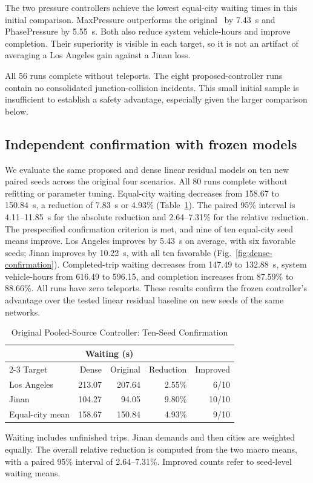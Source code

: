 The two pressure controllers achieve the lowest equal-city waiting times in this initial comparison. MaxPressure outperforms the original \method\ by 7.43~s and PhasePressure by 5.55~s. Both also reduce system vehicle-hours and improve completion. Their superiority is visible in each target, so it is not an artifact of averaging a Los Angeles gain against a Jinan loss.

All 56 runs complete without teleports. The eight proposed-controller runs contain no consolidated junction-collision incidents. This small initial sample is insufficient to establish a safety advantage, especially given the larger comparison below.

\subsection{Independent confirmation with frozen models}
We evaluate the same proposed and dense linear residual models on ten new paired seeds across the original four scenarios. All 80 runs complete without refitting or parameter tuning. Equal-city waiting decreases from 158.67 to 150.84~s, a reduction of 7.83~s or 4.93\% (Table~\ref{tab:dense-confirmation}). The paired 95\% interval is 4.11--11.85~s for the absolute reduction and 2.64--7.31\% for the relative reduction. The prespecified confirmation criterion is met, and nine of ten equal-city seed means improve. Los Angeles improves by 5.43~s on average, with six favorable seeds; Jinan improves by 10.22~s, with all ten favorable (Fig.~\ref{fig:dense-confirmation}). Completed-trip waiting decreases from 147.49 to 132.88~s, system vehicle-hours from 616.49 to 596.15, and completion increases from 87.59\% to 88.66\%. All runs have zero teleports. These results confirm the frozen controller's advantage over the tested linear residual baseline on new seeds of the same networks.

\begin{table}[!t]
\caption{Original Pooled-Source Controller: Ten-Seed Confirmation}
\label{tab:dense-confirmation}
\centering
\begin{tabular}{lrrrr}
\toprule
& \multicolumn{2}{c}{Waiting (s)} & & \\
\cmidrule(lr){2-3}
Target & Dense & Original & Reduction & Improved\\
\midrule
Los Angeles & 213.07 & 207.64 & 2.55\% & 6/10\\
Jinan & 104.27 & 94.05 & 9.80\% & 10/10\\
Equal-city mean & 158.67 & 150.84 & 4.93\% & 9/10\\
\bottomrule
\end{tabular}
\vspace{3pt}
\begin{minipage}{\columnwidth}\footnotesize
Waiting includes unfinished trips. Jinan demands and then cities are weighted equally. The overall relative reduction is computed from the two macro means, with a paired 95\% interval of 2.64--7.31\%. Improved counts refer to seed-level waiting means.
\end{minipage}
\end{table}

